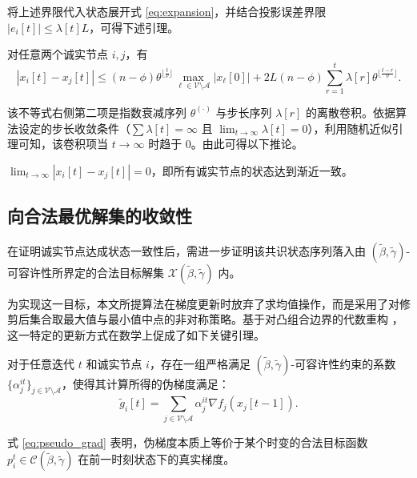 将上述界限代入状态展开式 \eqref{eq:expansion}，并结合投影误差界限 $|e_i[t]| \le \lambda[t]L$，可得下述引理。

\begin{lemma}\label{lem:2}
    对任意两个诚实节点 $i, j$，有
    \begin{equation}
        |x_i[t] - x_j[t]| \le (n - \phi)\theta^{\lfloor \frac{t}{\nu} \rfloor} \max_{\ell \in \mathcal{V}\setminus\mathcal{A}}|x_\ell[0]| + 2L(n - \phi)\sum_{r=1}^t \lambda[r]\theta^{\lfloor \frac{t-r}{\nu} \rfloor}.
    \end{equation}
\end{lemma}

该不等式右侧第二项是指数衰减序列 $\theta^{(\cdot)}$ 与步长序列 $\lambda[r]$ 的离散卷积。依据算法设定的步长收敛条件（$\sum \lambda[t] = \infty$ 且 $\lim_{t \to \infty}\lambda[t] = 0$），利用随机近似引理可知，该卷积项当 $t \to \infty$ 时趋于 $0$。由此可得以下推论。

\begin{corollary}\label{cor:1}
    $\lim_{t \to \infty} |x_i[t] - x_j[t]| = 0$，即所有诚实节点的状态达到渐近一致。
\end{corollary}

\subsection{向合法最优解集的收敛性}
\quad \quad  在证明诚实节点达成状态一致性后，需进一步证明该共识状态序列落入由 $(\tilde{\beta}, \tilde{\gamma})$-可容许性所界定的合法目标解集 $\mathcal{X}(\tilde{\beta}, \tilde{\gamma})$ 内。

为实现这一目标，本文所提算法在梯度更新时放弃了求均值操作，而是采用了对修剪后集合取最大值与最小值中点的非对称策略。基于对凸组合边界的代数重构 \cite{su2016fault}，这一特定的更新方式在数学上促成了如下关键引理。

\begin{lemma}\label{lem:3}
    对于任意迭代 $t$ 和诚实节点 $i$，存在一组严格满足 $(\tilde{\beta}, \tilde{\gamma})$-可容许性约束的系数 $\{\alpha_j^{it}\}_{j \in \mathcal{V} \setminus \mathcal{A}}$，使得其计算所得的伪梯度满足：
    \begin{equation} \label{eq:pseudo_grad}
        \tilde{g}_i[t] = \sum_{j \in \mathcal{V} \setminus \mathcal{A}} \alpha_j^{it} \nabla f_j(x_j[t-1]).
    \end{equation}
\end{lemma}

式 \eqref{eq:pseudo_grad} 表明，伪梯度本质上等价于某个时变的合法目标函数 $p_i^t \in \mathcal{C}(\tilde{\beta}, \tilde{\gamma})$ 在前一时刻状态下的真实梯度。

